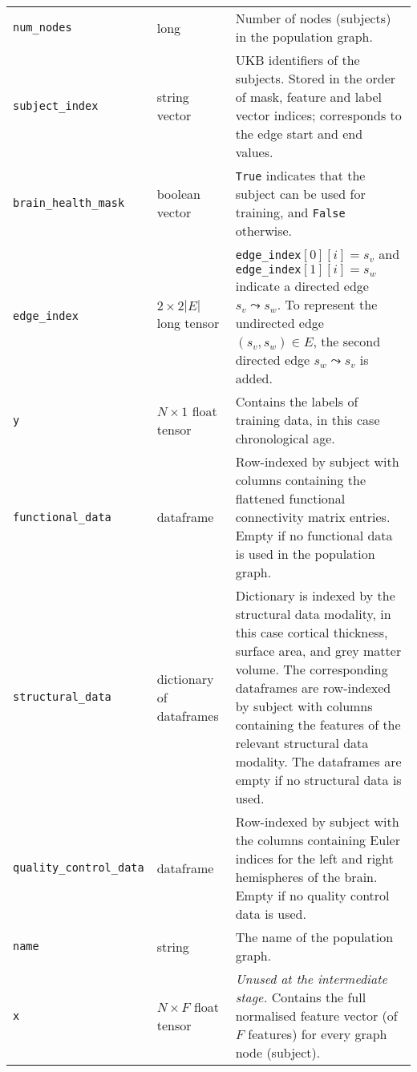 \begin{center}
\begin{longtable}[]{lp{}p{}}
    \texttt{num\_nodes} & long & Number of nodes (subjects) in the population graph. \\
    \texttt{subject\_index} & string vector & UKB identifiers of the subjects. Stored in the order of mask, feature and label vector indices; corresponds to the edge start and end values. \\
    \texttt{brain\_health\_mask} & boolean vector & \texttt{True} indicates that the subject can be used for training, and \texttt{False} otherwise. \\
    \texttt{edge\_index} & $2\times 2|E|$ \hfill\newline long tensor & \texttt{edge\_index}$[0][i]=s_v$ and \hfill \newline \texttt{edge\_index}$[1][i]=s_w$ indicate a directed \hfill \newline edge $s_v \leadsto s_w$. To represent the undirected edge $(s_v, s_w) \in E$, the second directed edge $s_w \leadsto s_v$ is added. \\
    \texttt{y} & $N \times 1$ \hfill \newline float tensor & Contains the labels of training data, in this case chronological age. \\
    \texttt{functional\_data} & dataframe & Row-indexed by subject with columns containing the flattened functional connectivity matrix entries. Empty if no functional data is used in the population graph. \\
    \texttt{structural\_data} & dictionary of \hfill \newline dataframes & Dictionary is indexed by the structural data modality, in this case cortical thickness, surface area, and grey matter volume. The corresponding dataframes are row-indexed by subject with columns containing the features of the relevant structural data modality. The dataframes are empty if no structural data is used. \\
    \texttt{quality\_control\_data} & dataframe & Row-indexed by subject with the columns containing Euler indices for the left and right hemispheres of the brain. Empty if no quality control data is used. \\
    \texttt{name} & string & The name of the population graph. \\
    \texttt{x} & $N \times F$ \hfill\newline float tensor & \textit{Unused at the intermediate stage.} Contains the full normalised feature vector (of $F$ features) for every graph node (subject). \\

\end{longtable}
\end{center}
